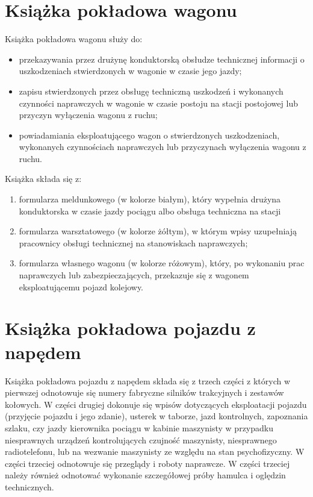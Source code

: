 \section{Książka pokładowa wagonu}
Książka pokładowa wagonu służy do:
\begin{itemize}
\item przekazywania przez drużynę konduktorską obsłudze technicznej informacji o uszkodzeniach stwierdzonych w wagonie w czasie jego jazdy;
\item zapisu stwierdzonych przez obsługę techniczną uszkodzeń i wykonanych czynności naprawczych w wagonie w czasie postoju na stacji postojowej lub przyczyn wyłączenia wagonu z ruchu;
\item powiadamiania eksploatującego wagon o stwierdzonych uszkodzeniach, wykonanych czynnościach naprawczych lub przyczynach wyłączenia wagonu z ruchu.
\end{itemize}
Książka składa się z:
\begin{enumerate}
\item formularza meldunkowego (w kolorze białym), który wypełnia drużyna konduktorska w czasie jazdy pociągu albo obsługa techniczna na stacji \item formularza warsztatowego (w kolorze żółtym), w którym wpisy uzupełniają pracownicy obsługi technicznej na stanowiskach naprawczych;
\item formularza własnego wagonu (w kolorze różowym), który, po wykonaniu prac naprawczych lub zabezpieczających, przekazuje się z wagonem eksploatującemu pojazd kolejowy.
\end{enumerate}

\section{Książka pokładowa pojazdu z napędem}
Książka pokładowa pojazdu z napędem składa się z trzech części z których w pierwszej odnotowuje się numery fabryczne silników trakcyjnych i zestawów kołowych. W części drugiej dokonuje się wpisów dotyczących eksploatacji pojazdu (przyjęcie pojazdu i jego zdanie), usterek w taborze, jazd kontrolnych, zapoznania szlaku, czy jazdy kierownika pociągu w kabinie maszynisty w przypadku niesprawnych urządzeń kontrolujących czujność maszynisty, niesprawnego radiotelefonu, lub na wezwanie maszynisty ze względu na stan psychofizyczny. W części trzeciej odnotowuje się przeglądy i roboty naprawcze. W części trzeciej należy również odnotować wykonanie szczegółowej próby hamulca i oględzin technicznych.

